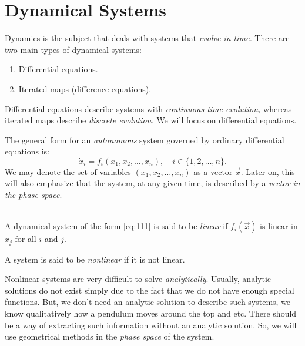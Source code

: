 \documentclass[oneside]{book}
\begin{document}
\section{Dynamical Systems}
Dynamics is the subject that deals with systems that \textit{evolve in time.} There are two main types of dynamical systems:
\begin{enumerate}
	\item Differential equations.
	\item Iterated maps (difference equations).
\end{enumerate}
Differential equations describe systems with \textit{continuous time evolution,} whereas iterated maps describe \textit{discrete evolution.} We will focus on differential equations.
\par
The general form for an \textit{autonomous} system governed by ordinary differential equations is:
\begin{equation} \label{eq:111}
\dot{x}_i = f_i (x_1, x_2, \ldots, x_n), \quad i \in \{1, 2, \ldots, n \}.
\end{equation}
We may denote the set of variables $ (x_1, x_2, \ldots, x_n) $ as a vector $ \vec{x} $. Later on, this will also emphasize that the system, at any given time, is described by a \textit{vector in the phase space}.
\\\\
\begin{definition} A dynamical system of the form \eqref{eq:111} is said to be \textit{linear} if $ f_i (\vec{x}) $ is linear in $ x_j $ for all $ i $ and $ j $.
\end{definition}
\begin{definition} A system is said to be \textit{nonlinear} if it is not linear.
\end{definition}
\par Nonlinear systems are very difficult to solve \textit{analytically}. Usually, analytic solutions do not exist simply due to the fact that we do not have enough special functions. But, we don't need an analytic solution to describe such systems, we know qualitatively how a pendulum moves around the top and etc. There should be a way of extracting such information without an analytic solution. So, we will use geometrical methods in the \textit{phase space} of the system.
\end{document}
